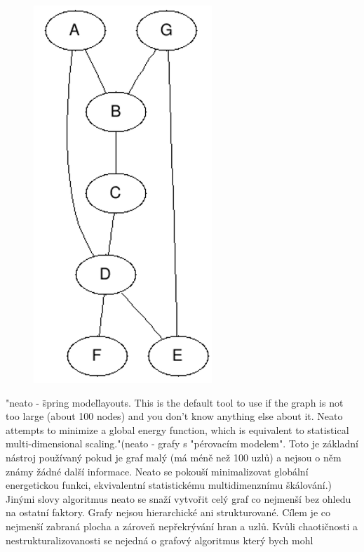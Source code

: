 \documentclass[color,table,oneside,nolot,nolof]{fithesis}
\begin{document}
\begin{figure}
	\centering
	\includegraphics[width=0.6\textwidth]{pictures/dot_example.png} 
\end{figure}
	"neato - \"spring model\" layouts.  This is the default tool to use if the graph is not too large (about 100 nodes) and you don't know anything else about it. Neato attempts to
	minimize a global energy function, which is equivalent to statistical multi-dimensional scaling."\cite{graphviz_layout}(neato - grafy s "pérovacím modelem". Toto je základní nástroj
	používaný pokud je graf malý (má méně než 100 uzlů) a nejsou o něm známy žádné další informace. Neato se pokouší minimalizovat globální energetickou funkci, ekvivalentní
	statistickému multidimenznímu škálování.) Jinými slovy algoritmus neato se snaží vytvořit celý graf co nejmenší bez ohledu na ostatní faktory. Grafy nejsou hierarchické ani 
	strukturované. Cílem je co nejmenší zabraná plocha a zároveň nepřekrývání hran a uzlů. Kvůli chaotičnosti a nestrukturalizovanosti se nejedná o grafový algoritmus který bych mohl
\end{document}
